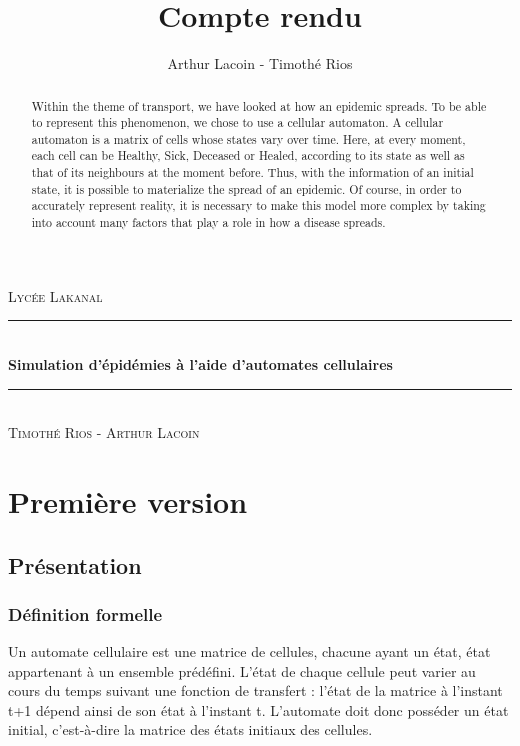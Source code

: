 \documentclass{article}
\title{Compte rendu}
\author{Arthur Lacoin - Timothé Rios}
\date{}
\newcommand{\HRule}{\rule{\linewidth}{0.5mm}}
\begin{document}
\begin{titlepage}
    \begin{sffamily}
    \begin{center}

        \textsc{\LARGE Lycée Lakanal}~\\[2cm]

        \HRule \\[0.4cm]
        { \huge \bfseries Simulation d'épidémies à l'aide d'automates cellulaires\\[0.4cm] }
    
        \HRule \\[2cm]
        \textsc{\Large Timothé Rios - Arthur Lacoin}\\[2cm]

    \end{center}
\end{sffamily}
\end{titlepage}

\begin{abstract}

Within the theme of transport, we have looked at how an epidemic spreads. To be able to represent this phenomenon, we chose to use a cellular automaton. A cellular automaton is a matrix of cells whose states vary over time. Here, at every moment, each cell can be Healthy, Sick, Deceased or Healed, according to its state as well as that of its neighbours at the moment before. Thus, with the information of an initial state, it is possible to materialize the spread of an epidemic. Of course, in order to accurately represent reality, it is necessary to make this model more complex by taking into account many factors that play a role in how a disease spreads.

\end{abstract}

\section{Première version}

\subsection{Présentation}

\subsubsection{Définition formelle}
	Un automate cellulaire est une matrice de cellules, chacune ayant un état, état appartenant à un ensemble prédéfini. L'état de chaque cellule peut varier au cours du temps suivant une fonction de transfert : l'état de la matrice à l'instant t+1 dépend ainsi de son état à l'instant t. L'automate doit donc posséder un état initial, c'est-à-dire la matrice des états initiaux des cellules.
\end{document}
